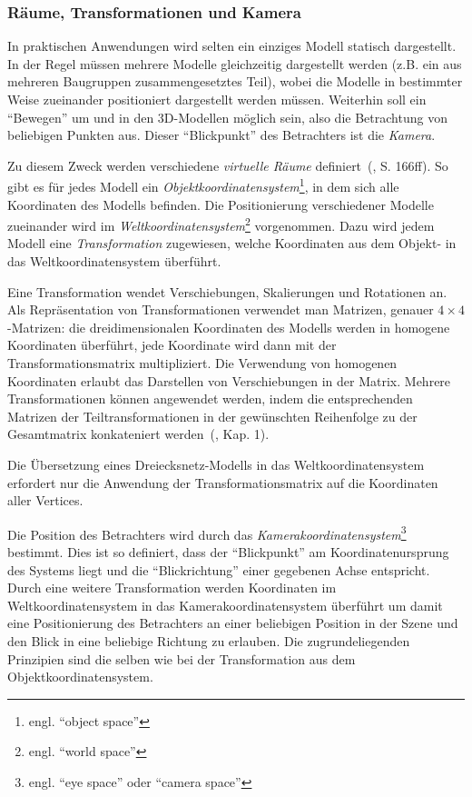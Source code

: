\documentclass[twoside,a4paper,fleqn,12pt]{article}
\begin{document}

\subsubsection{Räume, Transformationen und Kamera}

In praktischen Anwendungen wird selten ein einziges Modell statisch dargestellt. In der Regel müssen mehrere Modelle
gleichzeitig dargestellt werden (z.B. ein aus mehreren Baugruppen zusammengesetztes Teil), wobei die Modelle
in bestimmter Weise zueinander positioniert dargestellt werden müssen. Weiterhin soll ein "`Bewegen"' um und in den 3D-Modellen
 möglich sein, also die Betrachtung von beliebigen Punkten aus. Dieser "`Blickpunkt"' des Betrachters ist die \emph{Kamera}.

Zu diesem Zweck werden verschiedene \emph{virtuelle Räume} definiert~(\cite{watt_de}, S. 166ff).
 So gibt es für jedes Modell ein \emph{Objektkoordinatensystem}\footnote{engl. ``object space''},
in dem sich alle Koordinaten des Modells befinden. 
Die Positionierung verschiedener Modelle zueinander wird im \emph{Weltkoordinatensystem}\footnote{engl. ``world space''} vorgenommen. 
Dazu wird jedem Modell eine \emph{Transformation} zugewiesen, welche Koordinaten aus dem Objekt- in das
Weltkoordinatensystem überführt. 

Eine Transformation wendet Verschiebungen, Skalierungen und Rotationen an. Als Repräsentation von Transformationen
verwendet man Matrizen, genauer $4 \times 4$-Matrizen: die dreidimensionalen Koordinaten des Modells werden
in homogene Koordinaten überführt, %
jede Koordinate wird dann mit der Transformationsmatrix multipliziert. Die Verwendung von homogenen Koordinaten
erlaubt das Darstellen von Verschiebungen in der Matrix. Mehrere Transformationen können angewendet werden, indem 
die entsprechenden Matrizen der Teiltransformationen in der gewünschten Reihenfolge zu der Gesamtmatrix konkateniert werden~(\cite{watt_de}, Kap. 1).

Die Übersetzung eines Dreiecksnetz-Modells in das Weltkoordinatensystem erfordert nur die Anwendung der Transformationsmatrix
auf die Koordinaten aller Vertices.

Die Position des Betrachters wird durch das \emph{Kamerakoordinatensystem}\footnote{engl. ``eye space'' oder ``camera space''}
 bestimmt. Dies ist so definiert, dass der "`Blickpunkt"' am Koordinatenursprung des Systems liegt
und die "`Blickrichtung"' einer gegebenen Achse entspricht. 
Durch eine weitere Transformation werden Koordinaten im Weltkoordinatensystem in das Kamerakoordinatensystem
überführt um damit eine Positionierung des Betrachters an einer beliebigen Position in der Szene und den Blick in eine beliebige Richtung zu erlauben.
Die zugrundeliegenden Prinzipien sind die selben wie bei der Transformation aus dem Objektkoordinatensystem.
\end{document}
